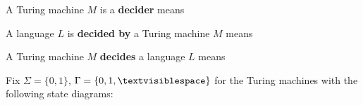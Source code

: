 \documentclass[12pt, oneside]{article}
\begin{document}
  A Turing machine $M$ is a {\bf decider}  means

  \vspace{20pt}
  
  A language  $L$ is {\bf decided by} a Turing  machine  $M$  means

  \vspace{20pt}
  
  A  Turing machine $M$ {\bf decides} a language $L$ means

  \vspace{20pt}
  
  
  Fix $\Sigma = \{0,1\}$, $\Gamma = \{ 0, 1, \textvisiblespace\}$ for the Turing machines with  the following state diagrams:
  
  \vspace{-35pt}
  
\end{document}
